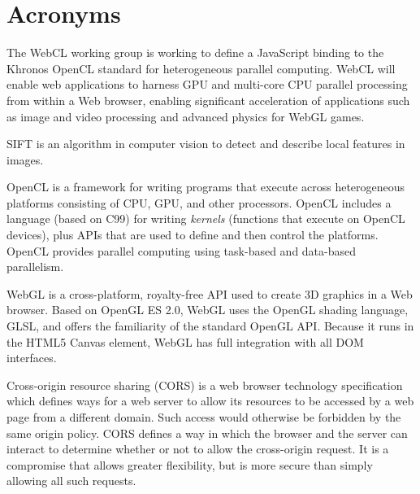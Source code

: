 \newpage
\section*{Acronyms}
\begin{acronym}[WYSIWYG]


    {\small The WebCL working group is working to define a JavaScript binding to the Khronos \ac{OpenCL}
    standard for heterogeneous parallel computing. WebCL will enable web applications to harness GPU and
    multi-core CPU parallel processing from within a Web browser, enabling significant acceleration of
    applications such as image and video processing and advanced physics for \ac{WebGL} games.\par}


    {\small SIFT is an algorithm in computer vision to detect and describe local features in images.\par}



    {\small OpenCL is a framework for writing programs that execute across heterogeneous platforms consisting
    of CPU, GPU, and other processors. OpenCL includes a language (based on C99) for writing \emph{kernels}
    (functions that execute on OpenCL devices), plus APIs that are used to define and then control the platforms.
    OpenCL provides parallel computing using task-based and data-based parallelism.\par}


    {\small WebGL is a cross-platform, royalty-free API used to create 3D graphics in a Web browser. Based on
    OpenGL ES 2.0, WebGL uses the OpenGL shading language, GLSL, and offers the familiarity of the standard OpenGL API.
    Because it runs in the HTML5 Canvas element, WebGL has full integration with all DOM interfaces.\par}


    {\small Cross-origin resource sharing (CORS) is a web browser technology specification which defines ways
    for a web server to allow its resources to be accessed by a web page from a different domain. Such access
    would otherwise be forbidden by the same origin policy. CORS defines a way in which the browser and the
    server can interact to determine whether or not to allow the cross-origin request. It is a compromise
    that allows greater flexibility, but is more secure than simply allowing all such requests.\par}


\end{acronym}
